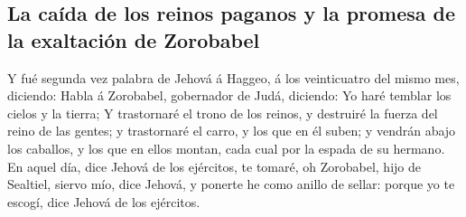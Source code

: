 \hypertarget{la-cauxedda-de-los-reinos-paganos-y-la-promesa-de-la-exaltaciuxf3n-de-zorobabel}{%
\subsection{La caída de los reinos paganos y la promesa de la exaltación
de
Zorobabel}\label{la-cauxedda-de-los-reinos-paganos-y-la-promesa-de-la-exaltaciuxf3n-de-zorobabel}}

 Y fué segunda vez palabra de Jehová á Haggeo, á los
veinticuatro del mismo mes, diciendo:  Habla á Zorobabel,
gobernador de Judá, diciendo: Yo haré temblar los cielos y la tierra;
 Y trastornaré el trono de los reinos, y destruiré la
fuerza del reino de las gentes; y trastornaré el carro, y los que en él
suben; y vendrán abajo los caballos, y los que en ellos montan, cada
cual por la espada de su hermano.  En aquel día, dice
Jehová de los ejércitos, te tomaré, oh Zorobabel, hijo de Sealtiel,
siervo mío, dice Jehová, y ponerte he como anillo de sellar: porque yo
te escogí, dice Jehová de los ejércitos.
